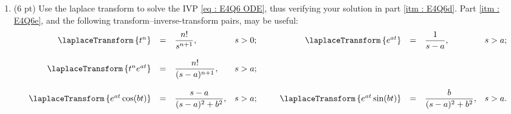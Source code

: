 \begin{enumerate}[resume,label=(\alph*)]
\item\label{itm : E4Q6f} (6 pt) Use the laplace transform to solve the IVP \eqref{eq : E4Q6 ODE}, thus verifying your solution in part \ref{itm : E4Q6d}. Part \ref{itm : E4Q6e}, and the following transform--inverse-transform pairs, may be useful:
\begin{align*}
\begin{array}{r c l c c r c l c}
\laplaceTransform\left\{t^{n}\right\}
&
=
&
\displaystyle\frac{n!}{s^{n + 1}},
&
s > 0;
&
\hspace{.1in}
&
\laplaceTransform\left\{e^{a t}\right\}
&
=
&
\displaystyle\frac{1}{s - a},
&
s > a;
\\
\\
\laplaceTransform\left\{t^{n} e^{a t}\right\}
&
=
&
\displaystyle\frac{n!}{(s - a)^{n + 1}},
&
s > a;
&
\hspace{.1in}
&
&
&
&
\\
\\
\laplaceTransform\left\{e^{a t} \cos(b t)\right\}
&
=
&
\displaystyle\frac{s - a}{(s - a)^{2} + b^{2}},
&
s > a;
&
\hspace{.1in}
&
\laplaceTransform\left\{e^{a t} \sin(b t)\right\}
&
=
&
\displaystyle\frac{b}{(s - a)^{2} + b^{2}},
&
s > a.
\end{array}
\end{align*}
\end{enumerate}

